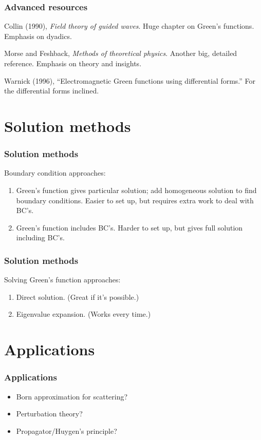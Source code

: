 \documentclass[12 pt, compress, handout, intlimits]{beamer}
\begin{document}
\begin{frame}[fragile]
    \frametitle{Advanced resources}
    Collin (1990), \emph{Field theory of guided waves}. 
    Huge chapter on Green's functions. Emphasis on dyadics.

    Morse and Feshback, \emph{Methods of theoretical physics}.
    Another big, detailed reference. Emphasis on theory and insights.

    Warnick (1996), ``Electromagnetic Green functions using differential forms.''
    For the differential forms inclined.

\end{frame}    

\note{}

\section{Solution methods}
\label{sec:solution_methods}

\note{}

\begin{frame}[fragile]
    \frametitle{Solution methods}
    Boundary condition approaches:
    \begin{enumerate}
    \item
        Green's function gives particular solution; add homogeneous solution to find boundary conditions.
        Easier to set up, but requires extra work to deal with BC's.
    \item
        Green's function includes BC's.
        Harder to set up, but gives full solution including BC's.
    \end{enumerate}
\end{frame}

\note{}

\begin{frame}[fragile]
    \frametitle{Solution methods}
     Solving Green's function approaches:
    \begin{enumerate}
    \item
        Direct solution. (Great if it's possible.)
    \item
        Eigenvalue expansion. (Works every time.)
    \end{enumerate}
\end{frame}

\note{}

\section{Applications}
\label{sec:applications}

\note{}

\begin{frame}[fragile]
    \frametitle{Applications}
    \begin{itemize}
    \item
        Born approximation for scattering?
    \item
        Perturbation theory?
    \item
        Propagator/Huygen's principle?
    \end{itemize}
\end{frame}

\note{}
\end{document}
